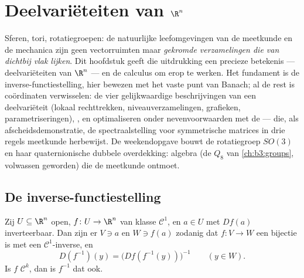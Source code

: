 \chapter{Deelvariëteiten van \texorpdfstring{$\R^n$}{Rn}}
\label{ch:b3:submanifolds}

Sferen, tori, rotatiegroepen: de natuurlijke leefomgevingen van
de meetkunde en de mechanica zijn geen vectorruimten maar
\emph{gekromde verzamelingen die van dichtbij vlak lijken}. Dit
hoofdstuk geeft die uitdrukking een precieze betekenis ---
deelvariëteiten van $\R^n$ --- en de calculus om erop te werken.
Het fundament is de inverse-functiestelling, hier bewezen met het
vaste punt van Banach; al de rest is coördinaten verwisselen: de
vier gelijkwaardige beschrijvingen van een deelvariëteit (lokaal
rechttrekken, niveauverzamelingen, grafieken, parametriseringen),
, en optimaliseren onder nevenvoorwaarden met de
 --- die, als afscheidsdemonstratie,
de spectraalstelling voor symmetrische matrices in drie regels
meetkunde herbewijst. De weekendopgave bouwt de rotatiegroep
$SO(3)$ en haar quaternionische dubbele overdekking: algebra (de
$Q_8$ van \cref{ch:b3:groups}, volwassen geworden) die de
meetkunde ontmoet.

\section{De inverse-functiestelling}

\begin{theorem}
\label{thm:b3:submanifolds:ift}
Zij $U \subseteq \R^n$ open, $f \colon U \to \R^n$ van klasse
$\mathcal C^1$, en $a \in U$ met $Df(a)$ inverteerbaar. Dan zijn
er  $V \ni a$ en $W \ni f(a)$ zodanig dat $f
\colon V \to W$ een bijectie is met een $\mathcal C^1$-inverse,
en
\[
D(f^{-1})(y) = \bigl(Df(f^{-1}(y))\bigr)^{-1}
\qquad (y \in W).
\]
Is $f$ $\mathcal C^k$, dan is $f^{-1}$ dat ook.
\end{theorem}

